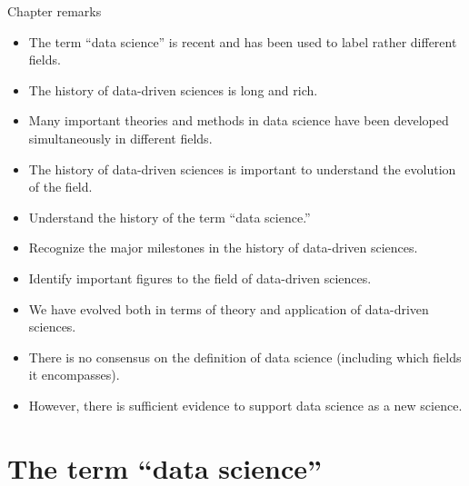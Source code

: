 \begin{mainbox}{Chapter remarks}


  \startcontents[chapters]
  \vspace{1em}


  \begin{itemize}
    \itemsep0em
    \item The term ``data science'' is recent and has been used to label rather different
      fields.
    \item The history of data-driven sciences is long and rich.
    \item Many important theories and methods in data science have been developed
      simultaneously in different fields.
    \item The history of data-driven sciences is important to understand the evolution of
      the field.
  \end{itemize}


  \begin{itemize}
    \itemsep0em
    \item Understand the history of the term ``data science.''
    \item Recognize the major milestones in the history of data-driven sciences.
    \item Identify important figures to the field of data-driven sciences.
  \end{itemize}


  \begin{itemize}
    \itemsep0em
    \item We have evolved both in terms of theory and application of data-driven sciences.
    \item There is no consensus on the definition of data science (including which fields
      it encompasses).
    \item However, there is sufficient evidence to support data science as a new science.
  \end{itemize}
\end{mainbox}

{}
\clearpage

\section{The term ``data science''}

